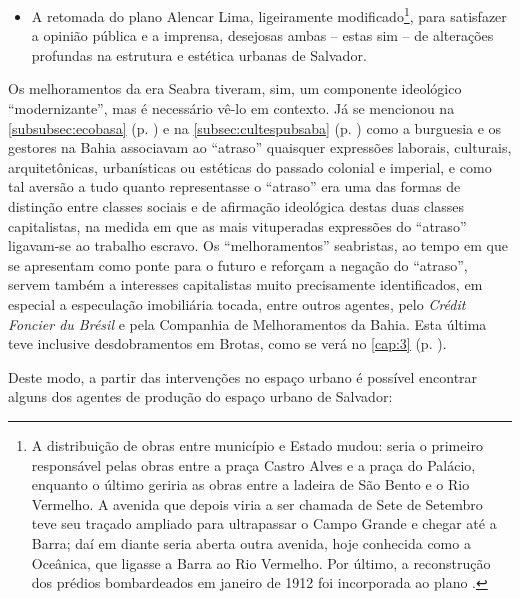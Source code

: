 \begin{itemize}
\item A retomada do plano Alencar Lima, ligeiramente modificado\footnote{A distribuição de obras entre município e Estado mudou: seria o primeiro responsável pelas obras entre a praça Castro Alves e a praça do Palácio, enquanto o último geriria as obras entre a ladeira de São Bento e o Rio Vermelho. A avenida que depois viria a ser chamada de Sete de Setembro teve seu traçado ampliado para ultrapassar o Campo Grande e chegar até a Barra; daí em diante seria aberta outra avenida, hoje conhecida como a Oceânica, que ligasse a Barra ao Rio Vermelho. Por último, a reconstrução dos prédios bombardeados em janeiro de 1912 foi incorporada ao plano \cite[p.~101]{CUNHA2011}.}, para satisfazer a opinião pública e a imprensa, desejosas ambas -- estas sim -- de alterações profundas na estrutura e estética urbanas de Salvador.
\end{itemize}

Os melhoramentos da era Seabra tiveram, sim, um componente ideológico ``modernizante'', mas é necessário vê-lo em contexto. Já se mencionou na \autoref{subsubsec:ecobasa} (p. \pageref{subsubsec:ecobasa}) e na \autoref{subsec:cultespubsaba} (p. \pageref{subsec:cultespubsaba}) como a burguesia e os gestores na Bahia associavam ao ``atraso'' quaisquer expressões laborais, culturais, arquitetônicas, urbanísticas ou estéticas do passado colonial e imperial, e como tal aversão a tudo quanto representasse o ``atraso'' era uma das formas de distinção entre classes sociais e de afirmação ideológica destas duas classes capitalistas, na medida em que as mais vituperadas expressões do ``atraso'' ligavam-se ao trabalho escravo. Os ``melhoramentos'' seabristas, ao tempo em que se apresentam como ponte para o futuro e reforçam a negação do ``atraso'', servem também a interesses capitalistas muito precisamente identificados, em especial a especulação imobiliária tocada, entre outros agentes, pelo \textit{Crédit Foncier du Brésil} e pela Companhia de Melhoramentos da Bahia. Esta última teve inclusive desdobramentos em Brotas, como se verá no \autoref{cap:3} (p. \pageref{cap:3}).

Deste modo, a partir das intervenções no espaço urbano é possível encontrar alguns dos agentes de produção do espaço urbano de Salvador:

